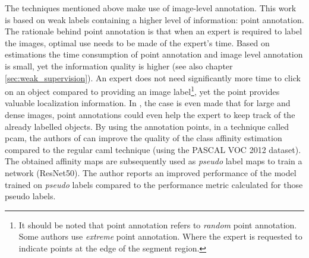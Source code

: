 \par{
    The techniques mentioned above make use of image-level annotation.
    This work is based on weak labels containing a higher level of information: point annotation.
    The rationale behind point annotation is that when an expert is required to label the images, optimal use needs to be made of the expert's time.
    Based on estimations \cite{Bearman2015} the time consumption of point annotation and image level annotation is small, yet the information quality is higher (see also chapter \ref{sec:weak_supervision}).
    An expert does not need significantly more time to click on an object compared to providing an image label\footnote{
        It should be noted that point annotation refers to \textit{random} point annotation. Some authors \cite{Maninis2018} use \textit{extreme} point annotation. 
        Where the expert is requested to indicate points at the edge of the segment region.
    }, yet the point provides valuable localization information.
    In \cite{McEver2020}, the case is even made that for large and dense images, point annotations could even help the expert to keep track of the already labelled objects.
    By using the annotation points, in a technique called \acrfull{pcam}, the authors of \cite{McEver2020} can improve the quality of the class affinity estimation compared to the regular \Gls{caml} technique (using the PASCAL VOC 2012 dataset).
    The obtained affinity maps are subsequently used as \textit{pseudo} label maps to train a network (ResNet50). 
    The author reports an improved performance of the model trained on \textit{pseudo} labels compared to the performance metric calculated for those pseudo labels.
}


